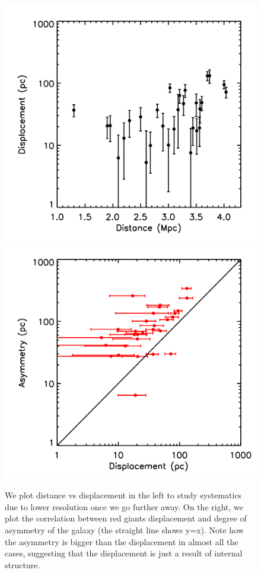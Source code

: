 \documentclass[useAMS,usenatbib,twocolumn]{mn2e}
\begin{document}
\begin{figure}
\includegraphics[scale=0.2]{figures/dispdist.png}
\includegraphics[scale=0.2]{figures/dispdispcm.png}
  \caption{We plot distance vs displacement in the left to study systematics
due to lower resolution once we go further away. On the right, we plot the
correlation between red giants displacement and degree of asymmetry of the
galaxy (the straight line shows y=x). Note how the asymmetry is bigger than
the displacement in almost all the cases, 
suggesting that the displacement is just a result of internal structure.}
\label{fig:rgsyst}
\end{figure}
\end{document}
